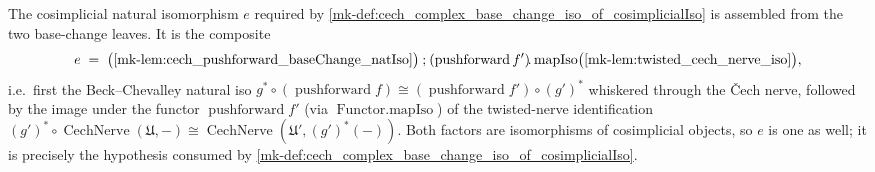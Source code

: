 \begin{definition}
  \label{mk-def:cech_complex_base_change_cosimplicialIso}

  The cosimplicial natural isomorphism \(e\) required by
  \ref{mk-def:cech_complex_base_change_iso_of_cosimplicialIso} is assembled from the two
  base-change leaves. It is the composite
  \[
    e \;=\;
      \bigl(\ref{mk-lem:cech_pushforward_baseChange_natIso}\bigr)
      \mathbin{;}
      (\operatorname{pushforward} f')\!.\operatorname{mapIso}
        \bigl(\ref{mk-lem:twisted_cech_nerve_iso}\bigr),
  \]
  i.e.\ first the Beck--Chevalley natural iso
  \(g^* \circ (\operatorname{pushforward} f) \cong (\operatorname{pushforward} f')
  \circ (g')^*\) whiskered through the {\v C}ech nerve, followed by the image under the
  functor \(\operatorname{pushforward} f'\) (via \(\operatorname{Functor.mapIso}\)) of the
  twisted-nerve identification
  \((g')^* \circ \operatorname{CechNerve}(\mathfrak{U}, -) \cong
  \operatorname{CechNerve}(\mathfrak{U}', (g')^*(-))\). Both factors are isomorphisms of
  cosimplicial objects, so \(e\) is one as well; it is precisely the hypothesis consumed
  by \ref{mk-def:cech_complex_base_change_iso_of_cosimplicialIso}.
\end{definition}

